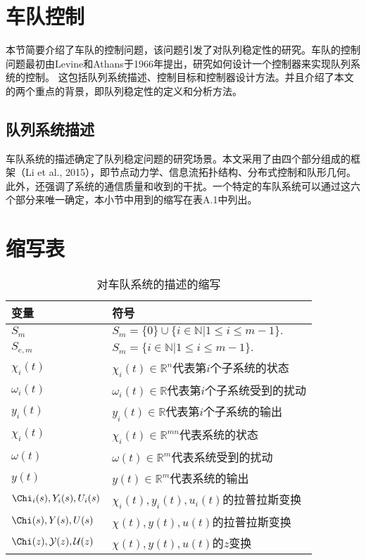 \begin{translation}
\section{车队控制}

本节简要介绍了车队的控制问题，该问题引发了对队列稳定性的研究。车队的控制问题最初由Levine和Athans于1966年提出，研究如何设计一个控制器来实现队列系统的控制。
这包括队列系统描述、控制目标和控制器设计方法。并且介绍了本文的两个重点的背景，即队列稳定性的定义和分析方法。

\subsection{队列系统描述}

车队系统的描述确定了队列稳定问题的研究场景。本文采用了由四个部分组成的框架（Li et al., 2015），即节点动力学、信息流拓扑结构、分布式控制和队形几何。
此外，还强调了系统的通信质量和收到的干扰。一个特定的车队系统可以通过这六个部分来唯一确定，本小节中用到的缩写在表A.1中列出。


\appendix

\section{缩写表}

\begin{table}
  \centering
  \caption{对车队系统的描述的缩写}
  \begin{tabular}{ll}
    \toprule
    变量          & 符号                        \\
    \midrule
    $S_m$           & $S_m = \{0\} \cup \{i \in \mathbb{N} | 1 \leqslant i \leqslant m-1 \}.$ \\
    $S_{e,m}$       & $S_m = \{i \in \mathbb{N} | 1 \leqslant i \leqslant m-1 \}.$                     \\
    $\chi_i(t)$     & $\chi_i(t) \in \mathbb{R}^n$代表第$i$个子系统的状态   \\
    $\omega_i(t)$   & $\omega_i(t) \in \mathbb{R}$代表第$i$个子系统受到的扰动 \\
    $y_i(t)$        & $y_i(t) \in \mathbb{R}$代表第$i$个子系统的输出        \\
    $\chi_i(t)$     & $\chi_i(t) \in \mathbb{R}^{mn}$代表系统的状态        \\
    $\omega(t)$     & $\omega(t) \in \mathbb{R}^m$代表系统受到的扰动        \\
    $y(t)$          & $y(t) \in \mathbb{R}^m$代表系统的输出        \\
    $\Chi_i(s), Y_i(s), U_i(s)$   & $\chi_i(t), y_i(t), u_i(t)$的拉普拉斯变换        \\
    $\Chi(s), Y(s), U(s)$         & $\chi(t), y(t), u(t)$的拉普拉斯变换        \\
    $\mathcal{\Chi}(z), \mathcal{Y}(z), \mathcal{U}(z)$   & $\chi(t), y(t), u(t)$的$z$变换        \\
    \bottomrule
  \end{tabular}
  \label{tab:appendix-translation-table1}
\end{table}



\end{translation}
